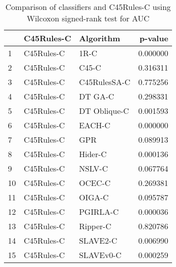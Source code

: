 \begin{table}
\footnotesize
\caption{Comparison of classifiers and C45Rules-C using Wilcoxon signed-rank test for AUC}
\label{tab:C45Rules-C wilcoxon AUC comparison}
\begin{tabular}{lllr}
\hline
 & C45Rules-C & Algorithm & p-value \\
\hline
1 & C45Rules-C & 1R-C & 0.000000 \\
2 & C45Rules-C & C45-C & 0.316311 \\
3 & C45Rules-C & C45RulesSA-C & 0.775256 \\
4 & C45Rules-C & DT GA-C & 0.298331 \\
5 & C45Rules-C & DT Oblique-C & 0.001593 \\
6 & C45Rules-C & EACH-C & 0.000000 \\
7 & C45Rules-C & GPR & 0.089913 \\
8 & C45Rules-C & Hider-C & 0.000136 \\
9 & C45Rules-C & NSLV-C & 0.067764 \\
10 & C45Rules-C & OCEC-C & 0.269381 \\
11 & C45Rules-C & OIGA-C & 0.095787 \\
12 & C45Rules-C & PGIRLA-C & 0.000036 \\
13 & C45Rules-C & Ripper-C & 0.820786 \\
14 & C45Rules-C & SLAVE2-C & 0.006990 \\
15 & C45Rules-C & SLAVEv0-C & 0.000259 \\
\hline
\end{tabular}
\end{table}
